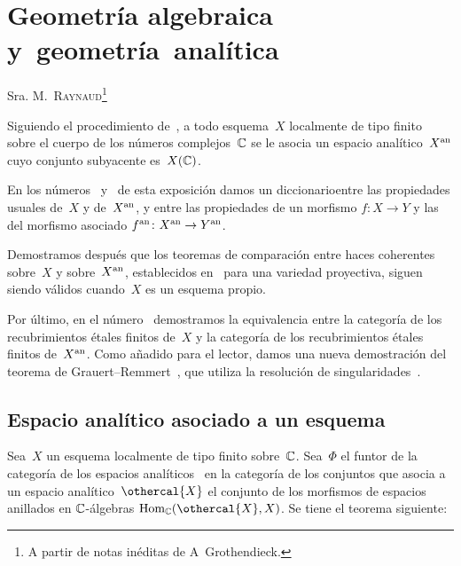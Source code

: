 
\chapter{Geometría algebraica y~geometría~analítica}
\label{XII}

\begin{center}
{Sra. M.\ \textsc{Raynaud}\footnote{A partir de notas inéditas de
A\ptbl\ Grothendieck.}}
\end{center}
\vspace*{1cm}

Siguiendo el procedimiento de~\cite{XII.10}, a todo esquema~$X$ localmente
de tipo finito sobre el cuerpo de los números complejos~$\mathbb C$ se le asocia
un espacio analítico~$X^{\mathrm{an}}$
\label{indnot:lb}%
cuyo conjunto subyacente es~$X(\mathbb C)$.

En los números~ y~ de esta exposición damos un
\og diccionario\fg entre las propiedades usuales de~$X$ y de~$X^{\mathrm{an}}$, y
entre las propiedades de un morfismo $f\colon X\to Y$ y las del morfismo
asociado $f^{\mathrm{an}}\colon X^{\mathrm{an}}\to Y^{\mathrm{an}}$.
\label{indnot:lc}%

Demostramos después que los teoremas de comparación entre haces coherentes
sobre~$X$ y sobre~$X^{\mathrm{an}}$, establecidos en~\cite[]{XII.10} para una
variedad proyectiva, siguen siendo válidos cuando~$X$ es un esquema propio.

Por último, en el número~ demostramos la equivalencia entre la
categoría de los recubrimientos étales finitos de~$X$ y la categoría de los
recubrimientos étales finitos de~$X^{\mathrm{an}}$. Como añadido para el lector, damos
una nueva demostración del teorema de Grauert--Remmert~\cite{XII.6}, que
utiliza la resolución de singularidades~\cite{XII.8}.

\section{Espacio analítico asociado a un esquema}
\label{XII.1}

Sea~$X$ un esquema localmente de tipo finito sobre~$\mathbb C$. Sea~$\Phi$ el
funtor de la categoría de los espacios analíticos~\cite[]{XII.4} en la
categoría de los conjuntos que asocia a un espacio analítico~$\othercal{X}$
el conjunto de los morfismos de espacios anillados en $\mathbb C$-álgebras
$\Hom_\CC(\othercal{X},X)$. Se tiene el teorema siguiente:

